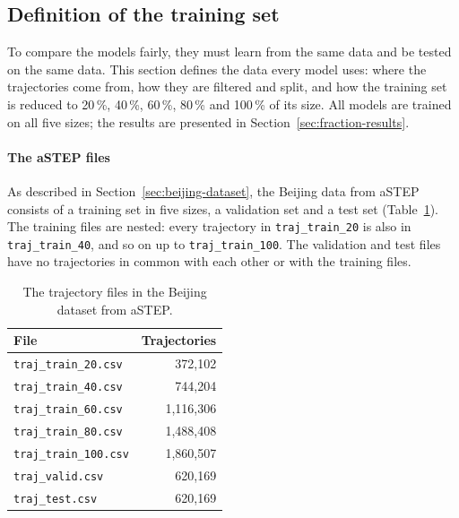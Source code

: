 \subsection{Definition of the training set}
\label{sec:training-set}

To compare the models fairly, they must learn from the same data and be tested on
the same data. This section defines the data every model uses: where the
trajectories come from, how they are filtered and split, and how the training set
is reduced to 20\,\%, 40\,\%, 60\,\%, 80\,\% and 100\,\% of its size. All models
are trained on all five sizes; the results are presented in
Section~\ref{sec:fraction-results}.

\paragraph{The aSTEP files}
As described in Section~\ref{sec:beijing-dataset}, the Beijing data from aSTEP
consists of a training set in five sizes, a validation set and a test set
(Table~\ref{tab:astep-files}). The training files are nested: every trajectory in
\texttt{traj\_train\_20} is also in \texttt{traj\_train\_40}, and so on up to
\texttt{traj\_train\_100}. The validation and test files have no trajectories in
common with each other or with the training files.

\begin{table}[htbp]
  \centering
  \begin{tabular}{|l|r|}
    \hline
    \textbf{File} & \textbf{Trajectories} \\
    \hline
    \texttt{traj\_train\_20.csv}  & 372{,}102 \\
    \texttt{traj\_train\_40.csv}  & 744{,}204 \\
    \texttt{traj\_train\_60.csv}  & 1{,}116{,}306 \\
    \texttt{traj\_train\_80.csv}  & 1{,}488{,}408 \\
    \texttt{traj\_train\_100.csv} & 1{,}860{,}507 \\
    \texttt{traj\_valid.csv}      & 620{,}169 \\
    \texttt{traj\_test.csv}       & 620{,}169 \\
    \hline
  \end{tabular}
  \caption{The trajectory files in the Beijing dataset from aSTEP.}
  \label{tab:astep-files}
\end{table}


